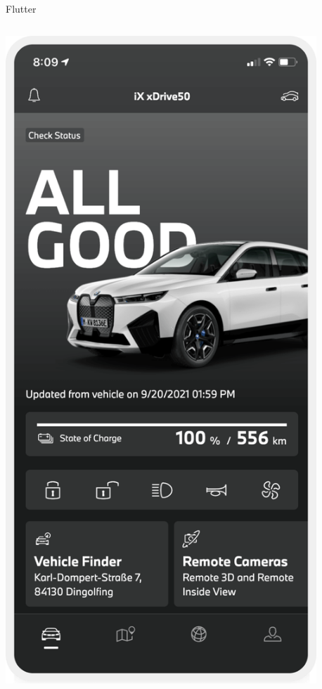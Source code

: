 \begin{frame}{Flutter}
\begin{columns}
    \includegraphics[width=0.9\textwidth]{slides/sysdev-software-stacks/flutter-app.png}
  \end{columns}
\end{frame}

